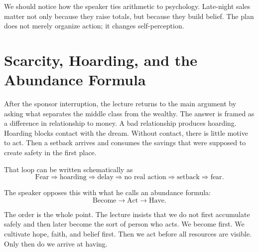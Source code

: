 We should notice how the speaker ties arithmetic to psychology. Late-night sales matter not only because they raise totals, but because they build belief. The plan does not merely organize action; it changes self-perception.

\section{Scarcity, Hoarding, and the Abundance Formula}

After the sponsor interruption, the lecture returns to the main argument by asking what separates the middle class from the wealthy. The answer is framed as a difference in relationship to money. A bad relationship produces hoarding. Hoarding blocks contact with the dream. Without contact, there is little motive to act. Then a setback arrives and consumes the savings that were supposed to create safety in the first place.

That loop can be written schematically as
\begin{equation}
\text{Fear} \Longrightarrow \text{hoarding} \Longrightarrow \text{delay}
\Longrightarrow \text{no real action} \Longrightarrow \text{setback} \Longrightarrow \text{fear}.
\end{equation}

The speaker opposes this with what he calls an abundance formula:
\begin{equation}
\text{Become} \to \text{Act} \to \text{Have}.
\end{equation}

The order is the whole point. The lecture insists that we do not first accumulate safely and then later become the sort of person who acts. We become first. We cultivate hope, faith, and belief first. Then we act before all resources are visible. Only then do we arrive at having.

\begin{figure}
\centering
{}
\end{figure}

